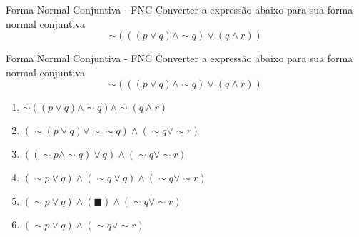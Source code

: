 \begin{frame}[t]{Forma Normal Conjuntiva - FNC}
	Converter a expressão abaixo para sua forma normal conjuntiva $$\sim (((p \vee q) \wedge\sim q) \vee (q \wedge r))$$
\end{frame}

\begin{frame}[t]{Forma Normal Conjuntiva - FNC}
	Converter a expressão abaixo para sua forma normal conjuntiva $$\sim (((p \vee q) \wedge\sim q) \vee (q \wedge r))$$

	\vskip 0.5cm

	\begin{enumerate}
	\item $\sim ((p \vee q) \wedge\sim q) \wedge\sim (q \wedge r)$
	\item $( \sim (p \vee q) \vee \sim\sim q) \wedge (\sim q \vee\sim r)$
	\item $((\sim p \wedge\sim q) \vee q) \wedge (\sim q \vee\sim r)$
	\item $(\sim p \vee q) \wedge (\sim q \vee q) \wedge (\sim q \vee\sim r)$
	\item $(\sim p \vee q) \wedge (\blacksquare) \wedge (\sim q \vee\sim r)$
	\item $(\sim p \vee q) \wedge (\sim q \vee\sim r)$
	\end{enumerate}
\end{frame}

